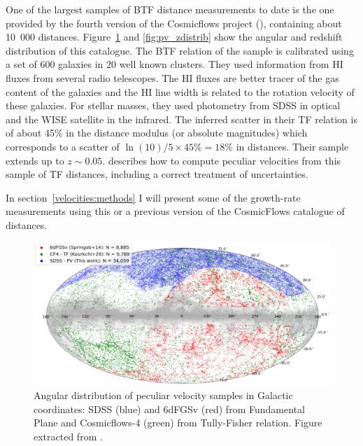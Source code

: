    One of the largest samples of BTF distance measurements to date is the one provided by 
    the fourth version of the Cosmicflows project (\cite{kourkchiCosmicflows4BaryonicTullyFisher2022}), 
    containing about 10~000 distances. 
    Figure~\ref{fig:pv_footprint} and \ref{fig:pv_zdistrib} show the angular and redshift distribution 
    of this catalogue. 
    The BTF relation of the sample is calibrated using a set of 600 galaxies in 20 well known clusters.
    They used information from HI fluxes from several radio telescopes. The HI fluxes are better 
    tracer of the gas content of the galaxies and the HI line width is related to the rotation 
    velocity of these galaxies. For stellar masses, they used photometry from SDSS in optical 
    and the WISE satellite in the infrared. 
    The inferred scatter in their TF relation is of about 45\% in the distance modulus (or absolute magnitudes) 
    which corresponds to a scatter of $\ln(10)/5 \times 45$\%$ = 18$\% in distances.  
    Their sample extends up to $z \sim 0.05$. 
    \cite{hoffmanCosmicflowsDistanceModuli2021} describes how to compute peculiar velocities 
    from this sample of TF distances, including a correct treatment of uncertainties. 

    In section~\ref{velocities:methods} I will present some of the growth-rate measurements 
    using this or a previous version of the CosmicFlows catalogue of distances. 


    \begin{figure}[t]
        \centering 
        \includegraphics[width=\textwidth]{fig/velocities/pv_footprints.png}
        \caption{Angular distribution of peculiar velocity samples in Galactic coordinates:
        SDSS (blue) and 6dFGSv (red) from Fundamental Plane and 
        Cosmicflows-4 (green) from Tully-Fisher relation.  
        Figure extracted from \cite{howlettSloanDigitalSky2022a}. }
        \label{fig:pv_footprint}
    \end{figure}

